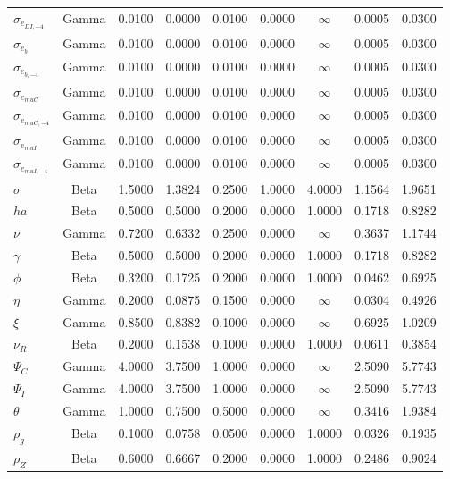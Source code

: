 \begin{center}
\begin{longtable}{lcccccccc}
$ \sigma_{{e_{DI,-4}}} $ & Gamma & 0.0100 & 0.0000 & 0.0100 & 0.0000 & $\infty$ & 0.0005 & 0.0300 \\ 
$ \sigma_{{e_b}} $ & Gamma & 0.0100 & 0.0000 & 0.0100 & 0.0000 & $\infty$ & 0.0005 & 0.0300 \\ 
$ \sigma_{{e_{b,-4}}} $ & Gamma & 0.0100 & 0.0000 & 0.0100 & 0.0000 & $\infty$ & 0.0005 & 0.0300 \\ 
$ \sigma_{{e_{muC}}} $ & Gamma & 0.0100 & 0.0000 & 0.0100 & 0.0000 & $\infty$ & 0.0005 & 0.0300 \\ 
$ \sigma_{{e_{muC,-4}}} $ & Gamma & 0.0100 & 0.0000 & 0.0100 & 0.0000 & $\infty$ & 0.0005 & 0.0300 \\ 
$ \sigma_{{e_{muI}}} $ & Gamma & 0.0100 & 0.0000 & 0.0100 & 0.0000 & $\infty$ & 0.0005 & 0.0300 \\ 
$ \sigma_{{e_{muI,-4}}} $ & Gamma & 0.0100 & 0.0000 & 0.0100 & 0.0000 & $\infty$ & 0.0005 & 0.0300 \\ 
$ {\sigma} $ & Beta & 1.5000 & 1.3824 & 0.2500 & 1.0000 & 4.0000 & 1.1564 & 1.9651 \\ 
$ {ha} $ & Beta & 0.5000 & 0.5000 & 0.2000 & 0.0000 & 1.0000 & 0.1718 & 0.8282 \\ 
$ \nu $ & Gamma & 0.7200 & 0.6332 & 0.2500 & 0.0000 & $\infty$ & 0.3637 & 1.1744 \\ 
$ \gamma $ & Beta & 0.5000 & 0.5000 & 0.2000 & 0.0000 & 1.0000 & 0.1718 & 0.8282 \\ 
$ {\phi} $ & Beta & 0.3200 & 0.1725 & 0.2000 & 0.0000 & 1.0000 & 0.0462 & 0.6925 \\ 
$ {\eta} $ & Gamma & 0.2000 & 0.0875 & 0.1500 & 0.0000 & $\infty$ & 0.0304 & 0.4926 \\ 
$ \xi $ & Gamma & 0.8500 & 0.8382 & 0.1000 & 0.0000 & $\infty$ & 0.6925 & 1.0209 \\ 
$ {\nu_R} $ & Beta & 0.2000 & 0.1538 & 0.1000 & 0.0000 & 1.0000 & 0.0611 & 0.3854 \\ 
$ {\Psi_{C}} $ & Gamma & 4.0000 & 3.7500 & 1.0000 & 0.0000 & $\infty$ & 2.5090 & 5.7743 \\ 
$ {\Psi_I} $ & Gamma & 4.0000 & 3.7500 & 1.0000 & 0.0000 & $\infty$ & 2.5090 & 5.7743 \\ 
$ {\theta} $ & Gamma & 1.0000 & 0.7500 & 0.5000 & 0.0000 & $\infty$ & 0.3416 & 1.9384 \\ 
$ {\rho_g} $ & Beta & 0.1000 & 0.0758 & 0.0500 & 0.0000 & 1.0000 & 0.0326 & 0.1935 \\ 
$ {\rho_Z} $ & Beta & 0.6000 & 0.6667 & 0.2000 & 0.0000 & 1.0000 & 0.2486 & 0.9024 \\ 

\end{longtable}
\end{center}
